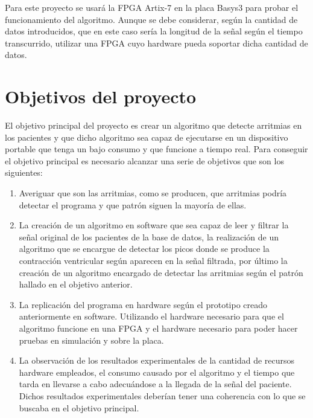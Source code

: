 Para este proyecto se usará la FPGA Artix-7 en la placa Basys3 para probar el funcionamiento del algoritmo. Aunque se debe considerar, según
la cantidad de datos introducidos, que en este caso sería la longitud de la señal según el tiempo transcurrido, utilizar
una FPGA cuyo hardware pueda soportar dicha cantidad de datos.


\section{Objetivos del proyecto}

El objetivo principal del proyecto es crear un algoritmo que detecte arritmias en los pacientes y que dicho algoritmo sea capaz de ejecutarse en un dispositivo portable 
que tenga un bajo consumo y que funcione a tiempo real.
Para conseguir el objetivo principal es necesario alcanzar una serie de objetivos que son los siguientes:
\begin{enumerate}
	\item Averiguar que son las arritmias, como se producen, que arritmias podría detectar el programa y que patrón siguen la mayoría de ellas.

	\item La creación de un algoritmo en software que sea capaz de leer y filtrar la señal original de los pacientes de la base de datos, la realización de
	un algoritmo que se encargue de detectar los picos donde se produce la contracción ventricular según aparecen en la señal filtrada, por último la creación 
	de un algoritmo encargado de detectar las arritmias según el patrón hallado en el objetivo anterior.
	
	\item La replicación del programa en hardware según el prototipo creado anteriormente en software. Utilizando el hardware necesario para que el algoritmo funcione en una FPGA 
	y el hardware necesario para poder hacer pruebas en simulación y sobre la placa.  

	\item La observación de los resultados experimentales de la cantidad de recursos hardware empleados, el consumo causado por el algoritmo y el tiempo que tarda en 
	llevarse a cabo adecuándose a la llegada de la señal del paciente. Dichos resultados experimentales deberían tener una coherencia con lo que se buscaba en el objetivo principal.
\end{enumerate}

